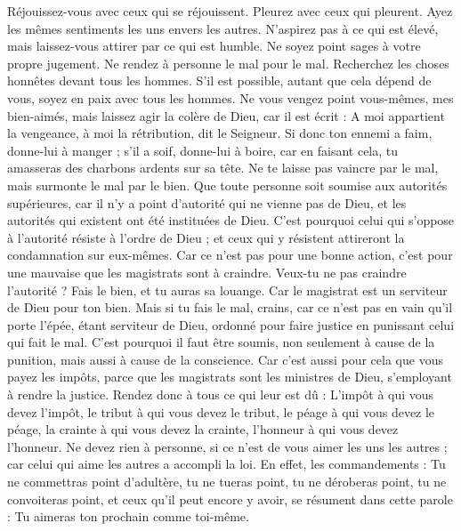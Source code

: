 \begin{multicols}{2}
Réjouissez-vous avec ceux qui se réjouissent. Pleurez avec ceux qui pleurent.
Ayez les mêmes sentiments les uns envers les autres. N’aspirez pas à ce qui est élevé, mais laissez-vous attirer par ce qui est humble. Ne soyez point sages à votre propre jugement.
Ne rendez à personne le mal pour le mal. Recherchez les choses honnêtes devant tous les hommes.
S’il est possible, autant que cela dépend de vous, soyez en paix avec tous les hommes.
Ne vous vengez point vous-mêmes, mes bien-aimés, mais laissez agir la colère de Dieu, car il est écrit : A moi appartient la vengeance, à moi la rétribution, dit le Seigneur.
Si donc ton ennemi a faim, donne-lui à manger ; s'il a soif, donne-lui à boire, car en faisant cela, tu amasseras des charbons ardents sur sa tête.
Ne te laisse pas vaincre par le mal, mais surmonte le mal par le bien.
\VerseOne{}Que toute personne soit soumise aux autorités supérieures, car il n'y a point d’autorité qui ne vienne pas de Dieu, et les autorités qui existent ont été instituées de Dieu.
C'est pourquoi celui qui s’oppose à l’autorité résiste à l’ordre de Dieu ; et ceux qui y résistent attireront la condamnation sur eux-mêmes.
Car ce n’est pas pour une bonne action, c’est pour une mauvaise que les magistrats sont à craindre. Veux-tu ne pas craindre l’autorité ? Fais le bien, et tu auras sa louange.
Car le magistrat est un serviteur de Dieu pour ton bien. Mais si tu fais le mal, crains, car ce n’est pas en vain qu’il porte l'épée, étant serviteur de Dieu, ordonné pour faire justice en punissant celui qui fait le mal.
C'est pourquoi il faut être soumis, non seulement à cause de la punition, mais aussi à cause de la conscience.
Car c'est aussi pour cela que vous payez les impôts, parce que les magistrats sont les ministres de Dieu, s'employant à rendre la justice.
Rendez donc à tous ce qui leur est dû : L’impôt à qui vous devez l’impôt, le tribut à qui vous devez le tribut, le péage à qui vous devez le péage, la crainte à qui vous devez la crainte, l’honneur à qui vous devez l'honneur.
Ne devez rien à personne, si ce n’est de vous aimer les uns les autres ; car celui qui aime les autres a accompli la loi.
En effet, les commandements : Tu ne commettras point d’adultère, tu ne tueras point, tu ne déroberas point, tu ne convoiteras point, et ceux qu’il peut encore y avoir, se résument dans cette parole : Tu aimeras ton prochain comme toi-même.

\end{multicols}
